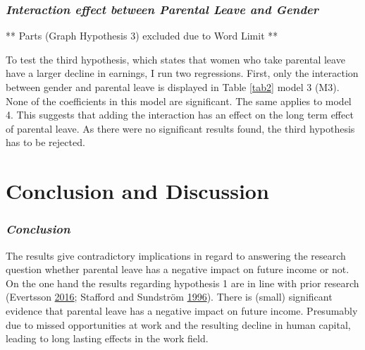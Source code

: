 \documentclass[
  11pt,
]{article}
\begin{document}
\hypertarget{interaction-effect-between-parental-leave-and-gender}{%
\subsubsection*{\texorpdfstring{\emph{Interaction effect between Parental Leave and Gender}}{Interaction effect between Parental Leave and Gender}}\label{interaction-effect-between-parental-leave-and-gender}}

** Parts (Graph Hypothesis 3) excluded due to Word Limit **

To test the third hypothesis, which states that women who take parental leave have a larger decline in earnings, I run two regressions. First, only the interaction between gender and parental leave is displayed in Table \ref{tab2} model 3 (M3). None of the coefficients in this model are significant. The same applies to model 4. This suggests that adding the interaction has an effect on the long term effect of parental leave. As there were no significant results found, the third hypothesis has to be rejected.

\hypertarget{conclusion-and-discussion}{%
\section{Conclusion and Discussion}\label{conclusion-and-discussion}}

\hypertarget{conclusion}{%
\subsubsection*{\texorpdfstring{\emph{Conclusion}}{Conclusion}}\label{conclusion}}

The results give contradictory implications in regard to answering the research question whether parental leave has a negative impact on future income or not. On the one hand the results regarding hypothesis 1 are in line with prior research (Evertsson \protect\hyperlink{ref-evertsson_parental_2016}{2016}; Stafford and Sundström \protect\hyperlink{ref-stafford_time_1996}{1996}). There is (small) significant evidence that parental leave has a negative impact on future income. Presumably due to missed opportunities at work and the resulting decline in human capital, leading to long lasting effects in the work field.
\end{document}

